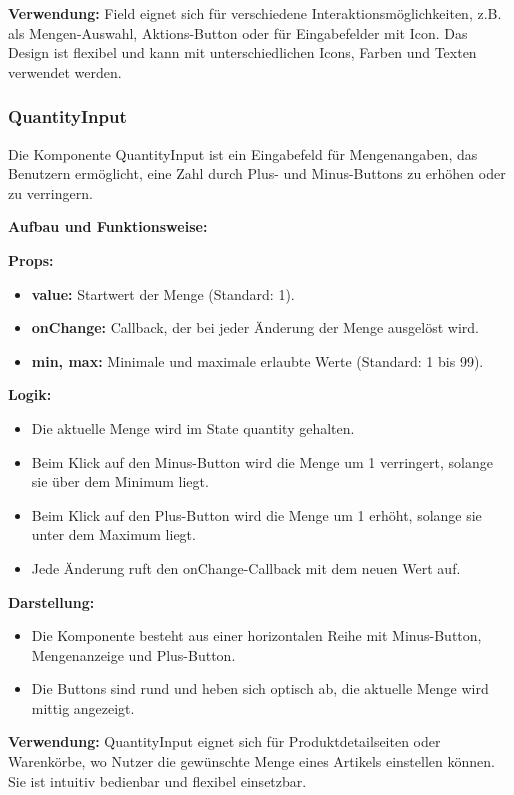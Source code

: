 \documentclass[12pt, a4paper]{report} %
\begin{document}
\noindent\textbf{Verwendung:} Field eignet sich für verschiedene Interaktionsmöglichkeiten, z.B. als Mengen-Auswahl, Aktions-Button oder für Eingabefelder mit Icon. Das Design ist flexibel und kann mit unterschiedlichen Icons, Farben und Texten verwendet werden.

\subsubsection{QuantityInput}
Die Komponente QuantityInput ist ein Eingabefeld für Mengenangaben, das Benutzern ermöglicht, eine Zahl durch Plus- und Minus-Buttons zu erhöhen oder zu verringern.

\noindent\textbf{Aufbau und Funktionsweise:}

\textbf{Props:}
\begin{itemize}
    \item \textbf{value:} Startwert der Menge (Standard: 1).
    \item \textbf{onChange:} Callback, der bei jeder Änderung der Menge ausgelöst wird.
    \item \textbf{min, max:} Minimale und maximale erlaubte Werte (Standard: 1 bis 99).
\end{itemize}

\textbf{Logik:}
\begin{itemize}
    \item Die aktuelle Menge wird im State quantity gehalten.
    \item Beim Klick auf den Minus-Button wird die Menge um 1 verringert, solange sie über dem Minimum liegt.
    \item Beim Klick auf den Plus-Button wird die Menge um 1 erhöht, solange sie unter dem Maximum liegt.
    \item Jede Änderung ruft den onChange-Callback mit dem neuen Wert auf.
\end{itemize}

\textbf{Darstellung:}
\begin{itemize}
    \item Die Komponente besteht aus einer horizontalen Reihe mit Minus-Button, Mengenanzeige und Plus-Button.
    \item Die Buttons sind rund und heben sich optisch ab, die aktuelle Menge wird mittig angezeigt.
\end{itemize}

\noindent\textbf{Verwendung:} QuantityInput eignet sich für Produktdetailseiten oder Warenkörbe, wo Nutzer die gewünschte Menge eines Artikels einstellen können. Sie ist intuitiv bedienbar und flexibel einsetzbar.
\end{document}
